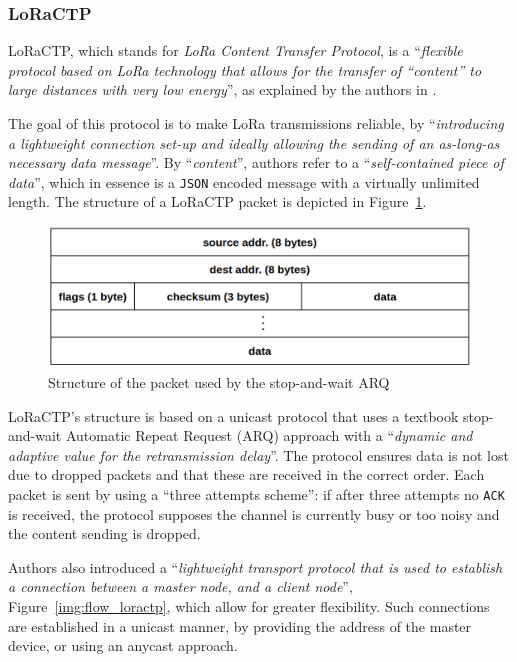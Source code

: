 			\subsubsection{LoRaCTP}\label{subsec:loractp}
				
				LoRaCTP, which stands for \textit{LoRa Content Transfer Protocol}, is a ``\textit{flexible protocol based on LoRa technology that allows for the transfer of ``content'' to large distances with very low energy}'', as explained by the authors in \cite{loractp}.
				
				The goal of this protocol is to make LoRa transmissions reliable, by ``\textit{introducing a lightweight connection set-up and ideally allowing the sending of an as-long-as necessary data message}''.
				By ``\textit{content}'', authors refer to a ``\textit{self-contained piece of data}'', which in essence is a \texttt{JSON} encoded message with a virtually unlimited length.
				The structure of a LoRaCTP packet is depicted in Figure~\ref{img:loractp_packet}.
			
				\begin{figure}[h]
					\centering
					\includegraphics[width=.75\textwidth]{resources/img/chap4/loractp_packet}
					\caption[Structure of the packet used by the stop-and-wait ARQ]{Structure of the packet used by the stop-and-wait ARQ \cite{loractp}}
					\label{img:loractp_packet}
				\end{figure}
				
				LoRaCTP's structure is based on a unicast protocol that uses a textbook stop-and-wait Automatic Repeat Request (ARQ) approach with a ``\textit{dynamic and adaptive value for the retransmission delay}''. 
				The protocol ensures data is not lost due to dropped packets and that these are received in the correct order.
				Each packet is sent by using a ``three attempts scheme'': if after three attempts no \texttt{ACK} is received, the protocol supposes the channel is currently busy or too noisy and the content sending is dropped.

				Authors also introduced a ``\textit{lightweight transport protocol that is used to establish a connection between a master node, and a client node}'', Figure~\ref{img:flow_loractp}, which allow for greater flexibility.
				Such connections are established in a unicast manner, by providing the address of the master device,
				or using an anycast approach.
				
